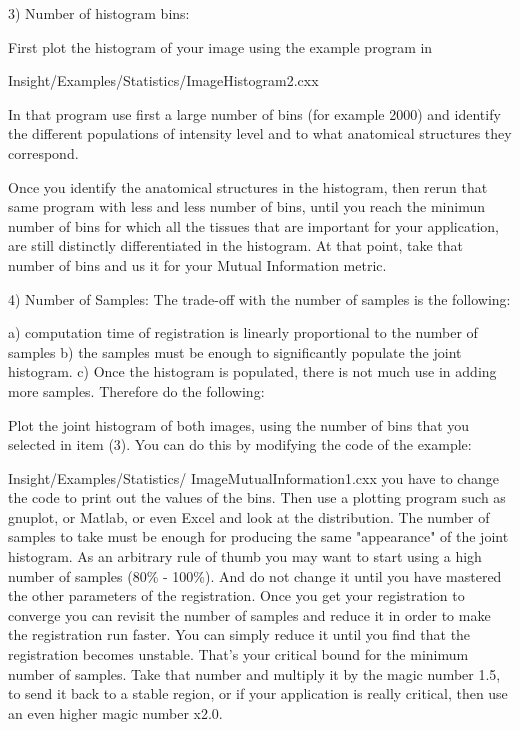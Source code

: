 3) Number of histogram bins:

    First plot the histogram of your image using the
    example program in

    Insight/Examples/Statistics/ImageHistogram2.cxx

    In that program use first a large number  of bins
    (for example 2000) and identify the different
    populations of intensity level and to what anatomical
    structures they correspond.

    Once you identify the anatomical structures in the
    histogram, then rerun that same program with less
    and less number of bins, until you reach the minimun
    number of bins for which all the tissues that are important
    for your application, are still distinctly differentiated in the
    histogram.  At that point, take that number of bins and
    us it for your Mutual Information metric.


4)  Number of Samples:
    The trade-off with the number of samples is the following:

    a) computation time of registration is linearly proportional
       to the number of samples
                                                                                                                        b) the samples must be enough to significantly populate
                                                                                                                           the joint histogram.
                                                                                                                        c) Once the histogram is populated, there is not much
                                                                                                                           use in adding more samples.
Therefore do the following:

Plot the joint histogram of both images, using the number
of bins that you selected in item (3). You can do this by
modifying the code of the example:

Insight/Examples/Statistics/
ImageMutualInformation1.cxx
you have to change the code to print out the values
of the bins. Then use a plotting program such as gnuplot,
or Matlab, or even Excel and look at the distribution.
The number of samples to take must be enough
for producing the same "appearance" of the joint histogram.
As an arbitrary rule of thumb you may want to start using
a high number of samples (80\% - 100\%). And do not
change it until you have mastered the other parameters
of the registration.  Once you get your registration to converge
you can revisit the number of samples and reduce it in order
to make the registration run faster. You can simply reduce it
until you find that the registration becomes unstable. That's
your critical bound for the minimum number of samples.
Take that number and multiply it by the magic number 1.5,
to send it back to a stable region, or if your application is
really critical, then use an even higher magic number x2.0.

